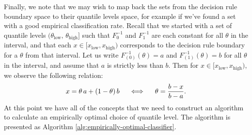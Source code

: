 Finally, we note that we may wish to map back the sets from the decision rule
boundary space to their quantile levels space, for example if we've found a set
with a good empirical classification rate.  Recall that we started with a set of
quantile levels
$(\theta_{\scriptscriptstyle\text{low}},\,
\theta_{\scriptscriptstyle\text{high}}]$ such that $F_{0}^{-1}$ and $F_{1}^{-1}$
are each constant for all $\theta$ in the interval, and that each
$x \in [x_{\scriptscriptstyle\text{low}}, x_{\scriptscriptstyle\text{high}})$
corresponds to the decision rule boundary for a $\theta$ from that interval.
Let us write $F_{(0)}^{-1}(\theta) = a$ and $F_{(1)}^{-1}(\theta) = b$ for all
$\theta$ in the interval, and assume that $a$ is strictly less than $b$.  Then
for
$x \in [x_{\scriptscriptstyle\text{low}}, x_{\scriptscriptstyle\text{high}})$,
we observe the following relation:
\begin{equation}
  \label{eq:map-to-quantile}
  x = \theta\, a + (1 - \theta)\, b
  \hspace{5mm} \Longleftrightarrow \hspace{5mm}
  \theta = \frac{b - x}{b - a}.
\end{equation}
At this point we have all of the concepts that we need to construct an algorithm
to calculate an empirically optimal choice of quantile level.  The algorithm is
presented as Algorithm \ref{alg:empirically-optimal-classifier}.

